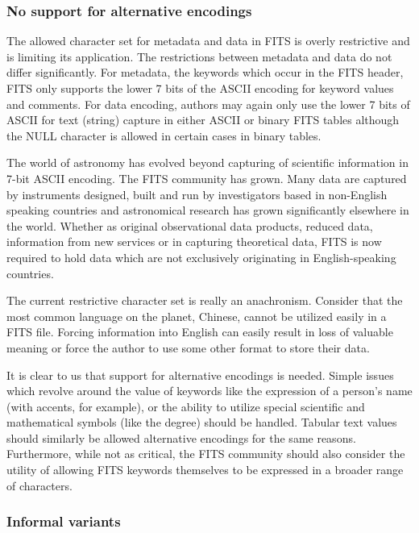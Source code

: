 \documentclass[final,authoryear,5p,times,twocolumn]{elsarticle}
\begin{document}
\subsubsection{No support for alternative encodings}


The allowed character set for metadata and data in FITS is overly
restrictive and is limiting its application. The restrictions between
metadata and data do not differ significantly. For metadata, the
keywords which occur in the FITS header, FITS only supports the lower
7 bits of the ASCII encoding for keyword values and comments. For
data encoding, authors may again only use the lower 7 bits of ASCII
for text (string) capture in either ASCII or binary FITS tables
although the NULL character is allowed in certain cases in binary
tables.


The world of astronomy has evolved beyond capturing of scientific
information in 7-bit ASCII encoding. The FITS community has grown.
Many data are captured by instruments designed, built and run by
investigators based in non-English speaking countries and astronomical
research has grown significantly elsewhere in the world. Whether as
original observational data products, reduced data, information from new
services or in capturing theoretical data, FITS is now required to hold
data which are not exclusively originating in English-speaking countries.


The current restrictive character set is really an
anachronism. Consider that the most common language on the planet,
Chinese, cannot be utilized easily in a FITS file. Forcing information
into English can easily result in loss of valuable meaning or force
the author to use some other format to store their data.


It is clear to us that support for alternative encodings is
needed. Simple issues which revolve around the value of keywords
like the expression of a person's name (with accents, for example), or
the ability to utilize special scientific and mathematical symbols
(like the degree) should be handled. Tabular text values should
similarly be allowed alternative encodings for the same
reasons. Furthermore, while not as critical, the FITS community should
also consider the utility of allowing FITS keywords themselves to be
expressed in a broader range of characters.


\subsubsection{Informal variants}
\end{document}
